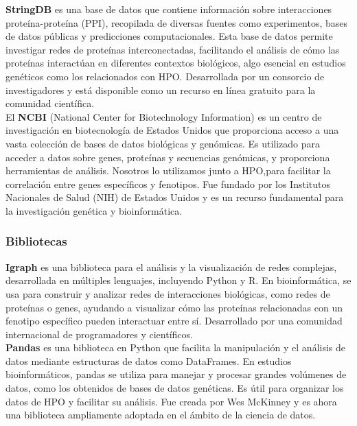 \textbf{StringDB} es una base de datos que contiene información sobre interacciones proteína-proteína (PPI), recopilada de diversas fuentes como experimentos, bases de datos públicas y predicciones computacionales.
Esta base de datos permite investigar redes de proteínas interconectadas, facilitando el análisis de cómo las proteínas interactúan en diferentes contextos biológicos, algo esencial en estudios genéticos como los relacionados con HPO.
Desarrollada por un consorcio de investigadores y está disponible como un recurso en línea gratuito para la comunidad científica.\\

 

El \textbf{NCBI} (National Center for Biotechnology Information) es un centro de investigación en biotecnología de Estados Unidos que proporciona acceso a una vasta colección de bases de datos biológicas y genómicas.
Es utilizado para acceder a datos sobre genes, proteínas y secuencias genómicas, y proporciona herramientas de análisis. Nosotros lo utilizamos junto a HPO,para facilitar la correlación entre genes específicos y fenotipos.
Fue fundado por los Institutos Nacionales de Salud (NIH) de Estados Unidos y es un recurso fundamental para la investigación genética y bioinformática.



\subsubsection{Bibliotecas}




\textbf{Igraph} es una biblioteca para el análisis y la visualización de redes complejas, desarrollada en múltiples lenguajes, incluyendo Python y R.
En bioinformática, se usa para construir y analizar redes de interacciones biológicas, como redes de proteínas o genes, ayudando a visualizar cómo las proteínas relacionadas con un fenotipo específico pueden interactuar entre sí.
Desarrollado por una comunidad internacional de programadores y científicos.\\


\textbf{Pandas} es una biblioteca en Python que facilita la manipulación y el análisis de datos mediante estructuras de datos como DataFrames.
En estudios bioinformáticos, pandas se utiliza para manejar y procesar grandes volúmenes de datos, como los obtenidos de bases de datos genéticas. Es útil para organizar los datos de HPO y facilitar su análisis.
Fue creada por Wes McKinney y es ahora una biblioteca ampliamente adoptada en el ámbito de la ciencia de datos.\\


